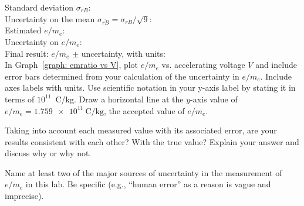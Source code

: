 \documentclass[addpoints]{physlabs}
\begin{document}
\begin{postlab}
    Standard deviation $\sigma_{rB}$:\\[3em]

    Uncertainty on the mean $\sigma_{\overline{rB}} = \sigma_{rB}/\sqrt{9}$:\\[3em]

    Estimated $e/m_e$:\\[3em]

    Uncertainty on $e/m_e$:\\[3em]

    Final result: $e/m_e$ $\pm$ uncertainty, with units:\\[3em]

    \filbreak
    \question[4] In Graph~\ref{graph: emratio vs V}, plot $e/m_e$ vs. accelerating voltage $V$ and include error bars determined from your calculation of the uncertainty in $e/m_e$. Include axes labels with units. Use scientific notation in your y-axis label by stating it in terms of $10^{11}$~C/kg. Draw a horizontal line at the $y$-axis value of $e/m_e=\qty{1.759e11}{\coulomb/\kilo\gram}$, the accepted value of $e/m_e$.

    \begin{center}
    \captionsetup{font=normalsize}
    \end{center}

    \filbreak
    \question[3] Taking into account each measured value with its associated error, are your results consistent with each other? With the true value? Explain your answer and discuss why or why not.
    \begin{solution}[3cm]
        
    \end{solution}

    \filbreak
    \question[2] Name at least two of the major sources of uncertainty in the measurement of $e/m_e$ in this lab. Be specific (e.g., ``human error'' as a reason is vague and imprecise).
    \begin{solution}[3cm]
        
    \end{solution}
    
\end{postlab}
\end{document}
